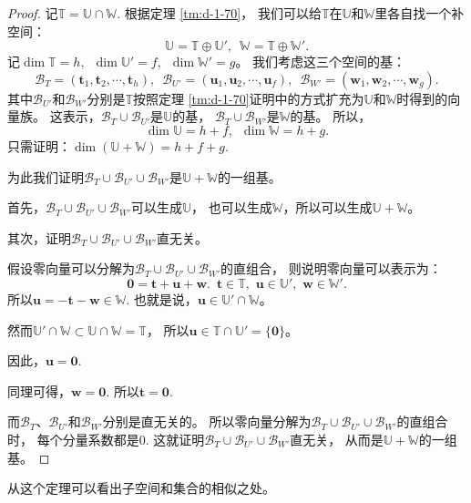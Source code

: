 \documentclass[12pt,UTF8]{ctexbook}
\begin{document}
\begin{appendix}
\begin{proof}
    记$\mathbb{T} = \mathbb{U} \cap \mathbb{W}$. 根据定理 \ref{tm:d-1-70}，
    我们可以给$\mathbb{T}$在$\mathbb{U}$和$\mathbb{W}$里各自找一个补空间：
    $$ \mathbb{U} = \mathbb{T} \oplus \mathbb{U}', \,\,\, \mathbb{W} = \mathbb{T} \oplus \mathbb{W}'.$$
    记$\dim \mathbb{T} = h, \,\,\, \dim \mathbb{U}' = f, \,\,\, \dim \mathbb{W}' = g$。
    我们考虑这三个空间的基：
    $$ \mathcal{B}_T = (\mathbf{t}_1, \mathbf{t}_2, \cdots, \mathbf{t}_h), \,\,\, \mathcal{B}_{U'} = (\mathbf{u}_1, \mathbf{u}_2, \cdots, \mathbf{u}_f), \,\,\, \mathcal{B}_{W'} = (\mathbf{w}_1, \mathbf{w}_2, \cdots, \mathbf{w}_g). $$  
    其中$\mathcal{B}_{U'}$和$\mathcal{B}_{W'}$分别是$\mathbb{T}$按照定理 
    \ref{tm:d-1-70}证明中的方式扩充为$\mathbb{U}$和$\mathbb{W}$时得到的向量族。
    这表示，$\mathcal{B}_T\cup\mathcal{B}_{U'}$是$\mathbb{U}$的基，
    $\mathcal{B}_T\cup\mathcal{B}_{W'}$是$\mathbb{W}$的基。
    所以，
    $$\dim \mathbb{U} = h + f,\,\,\,\dim \mathbb{W} = h + g.$$
    只需证明：$ \dim (\mathbb{U} + \mathbb{W}) = h + f + g.$

    为此我们证明$\mathcal{B}_T\cup\mathcal{B}_{U'}\cup\mathcal{B}_{W'}$是$\mathbb{U} + \mathbb{W}$的一组基。

    首先，$\mathcal{B}_T\cup\mathcal{B}_{U'}\cup\mathcal{B}_{W'}$可以生成$\mathbb{U}$，
    也可以生成$\mathbb{W}$，所以可以生成$\mathbb{U} + \mathbb{W}$。

    其次，证明$\mathcal{B}_T\cup\mathcal{B}_{U'}\cup\mathcal{B}_{W'}$直无关。

    假设零向量可以分解为$\mathcal{B}_T\cup\mathcal{B}_{U'}\cup\mathcal{B}_{W'}$的直组合，
    则说明零向量可以表示为：
    $$ \mathbf{0} = \mathbf{t} + \mathbf{u} + \mathbf{w}. \,\,\,\mathbf{t}\in\mathbb{T},\,\,\mathbf{u}\in\mathbb{U}',\,\,\mathbf{w}\in\mathbb{W}'.$$
    所以$\mathbf{u} = -\mathbf{t} - \mathbf{w} \in \mathbb{W}$.
    也就是说，$\mathbf{u}\in \mathbb{U}'\cap\mathbb{W}$。

    然而$\mathbb{U}'\cap\mathbb{W} \subset \mathbb{U}\cap\mathbb{W} = \mathbb{T}$，
    所以$\mathbf{u}\in\mathbb{T}\cap\mathbb{U}' = \{\mathbf{0}\}$。

    因此，$\mathbf{u} = \mathbf{0}.$

    同理可得，$\mathbf{w} = \mathbf{0}.$ 所以$\mathbf{t} = \mathbf{0}.$

    而$\mathcal{B}_T$、$\mathcal{B}_{U'}$和$\mathcal{B}_{W'}$分别是直无关的。
    所以零向量分解为$\mathcal{B}_T\cup\mathcal{B}_{U'}\cup\mathcal{B}_{W'}$的直组合时，
    每个分量系数都是0. 
    这就证明$\mathcal{B}_T\cup\mathcal{B}_{U'}\cup\mathcal{B}_{W'}$直无关，
    从而是$\mathbb{U} + \mathbb{W}$的一组基。

\end{proof}

从这个定理可以看出子空间和集合的相似之处。


\end{appendix}
\end{document}

